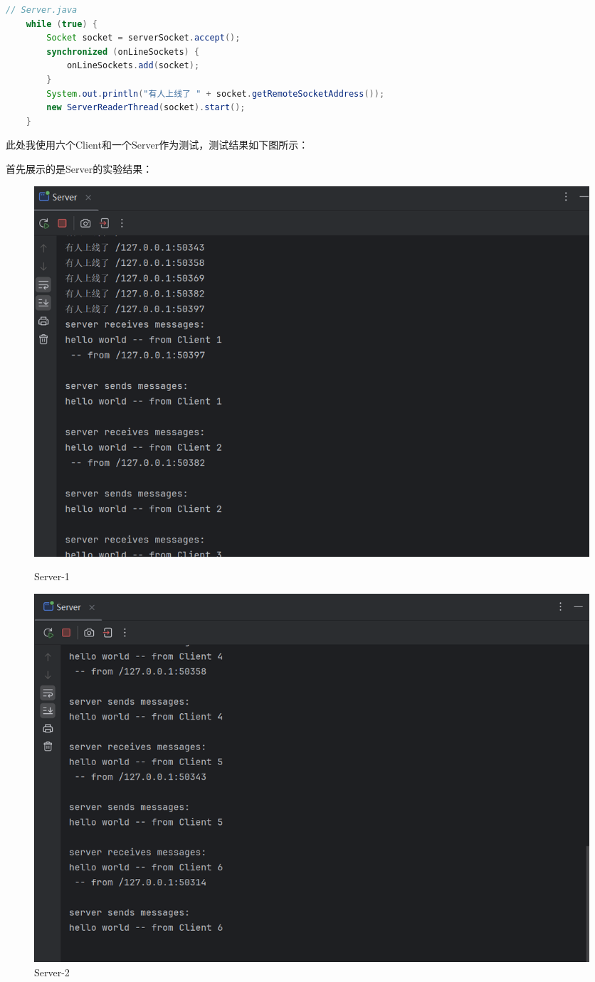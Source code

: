 \documentclass{article}
\begin{document}
	\begin{lstlisting}[language=Java, title=支持5个以上客户端同时发送消息并正确打印, tabsize=4]
	// Server.java
	while (true) {
		Socket socket = serverSocket.accept();
		synchronized (onLineSockets) {
			onLineSockets.add(socket);
		}
		System.out.println("有人上线了 " + socket.getRemoteSocketAddress());
		new ServerReaderThread(socket).start();
	}
	\end{lstlisting}
	
	此处我使用六个Client和一个Server作为测试，测试结果如下图所示：
	
	首先展示的是Server的实验结果：
	
	\begin{figure}[H]
		\centering
		\begin{minipage}[b]{0.45\textwidth}
			\includegraphics[width=\textwidth]{./images/2.支持5个以上客户端同时发送消息并逐一打印-Server-1.png}
			\caption{Server-1}
		\end{minipage}
		\hfill
		\begin{minipage}[b]{0.45\textwidth}
			\includegraphics[width=\textwidth]{./images/2.支持5个以上客户端同时发送消息并逐一打印-Server-2.png}
			\caption{Server-2}
		\end{minipage}
	\end{figure}
	
\end{document}
